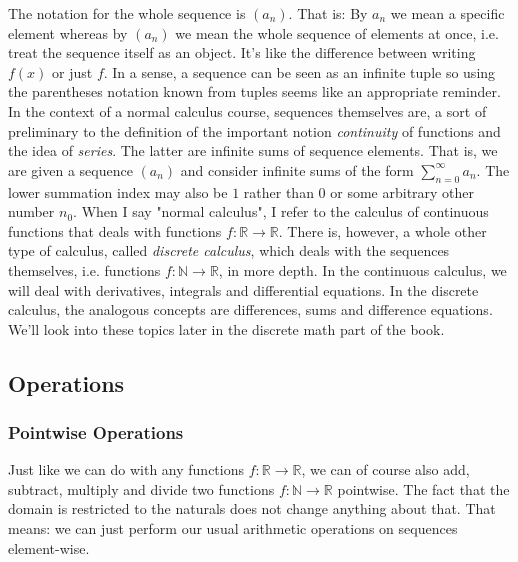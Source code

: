 \medskip
The notation for the whole sequence is $(a_n)$. That is: By $a_n$ we mean a specific element whereas by $(a_n)$ we mean the whole sequence of elements at once, i.e. treat the sequence itself as an object. It's like the difference between writing $f(x)$ or just $f$. In a sense, a sequence can be seen as an infinite tuple so using the parentheses notation known from tuples seems like an appropriate reminder. In the context of a normal calculus course, sequences themselves are, a sort of preliminary to the definition of the important notion \emph{continuity} of functions and the idea of \emph{series}. The latter are infinite sums of sequence elements. That is, we are given a sequence $(a_n)$ and consider infinite sums of the form $\sum_{n=0}^{\infty} a_n$. The lower summation index may also be $1$ rather than $0$ or some arbitrary other number $n_0$. When I say "normal calculus", I refer to the calculus of continuous functions that deals with functions $f: \mathbb{R} \rightarrow \mathbb{R}$. There is, however, a whole other type of calculus, called \emph{discrete calculus}, which deals with the sequences themselves, i.e. functions $f: \mathbb{N} \rightarrow \mathbb{R}$, in more depth. In the continuous calculus, we will deal with derivatives, integrals and differential equations. In the discrete calculus, the analogous concepts are differences, sums and difference equations. We'll look into these topics later in the discrete math part of the book. 


\subsection{Operations}

\subsubsection{Pointwise Operations}
Just like we can do with any functions $f: \mathbb{R} \rightarrow \mathbb{R}$, we can of course also add, subtract, multiply and divide two functions $f: \mathbb{N} \rightarrow \mathbb{R}$ pointwise. The fact that the domain is restricted to the naturals does not change anything about that. That means: we can just perform our usual arithmetic operations on sequences element-wise.

